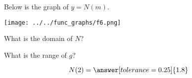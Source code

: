 \documentclass{ximera}
\author{Lee Wayand}
\begin{document}
\begin{exercise}  





Below is the graph of $y=N(m)$.  

\begin{image}
\texttt{[image: ../../func\_graphs/f6.png]}
\end{image}









\begin{question} 


What is the domain of $N$?\\


\begin{multipleChoice}
\choice {$[-1, 6]$}
\choice [correct]{$[-1, 6)$}
\choice {$[-1, 2) \cup  (2, 6)$}
\choice {$[-1, 2) \cup  (2, 6]$}
\end{multipleChoice}

\end{question}






\begin{question} 


What is the range of $g$?\\


\begin{multipleChoice}
\choice {$[-3.2, 4.5]$}
\choice {$[-3.2, 4.5)$}
\choice [correct]{$[-3.2, -2.2) \cup  [1.8, 4.5)$}
\choice {$[-1, 2) \cup  (2, 6)$}
\end{multipleChoice}


\end{question}









\begin{question} 



\[  N(2) = \answer[tolerance=0.25]{1.8}  \]

\end{question}










\begin{question} 




\end{question}
\end{exercise}
\end{document}
